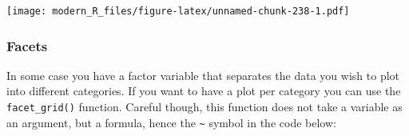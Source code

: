 \documentclass[]{gitbook}
\newenvironment{Shaded}{\begin{snugshade}}{\end{snugshade}}
\newcommand{\CommentTok}[1]{\textcolor[rgb]{0.56,0.35,0.01}{\textit{#1}}}
\newcommand{\DataTypeTok}[1]{\textcolor[rgb]{0.13,0.29,0.53}{#1}}
\newcommand{\KeywordTok}[1]{\textcolor[rgb]{0.13,0.29,0.53}{\textbf{#1}}}
\newcommand{\NormalTok}[1]{#1}
\newcommand{\OperatorTok}[1]{\textcolor[rgb]{0.81,0.36,0.00}{\textbf{#1}}}
\newcommand{\StringTok}[1]{\textcolor[rgb]{0.31,0.60,0.02}{#1}}
\theoremstyle{definition}
\theoremstyle{definition}
\theoremstyle{definition}
\theoremstyle{remark}
\begin{document}
\begin{Shaded}
\end{Shaded}

\texttt{[image: modern\_R\_files/figure-latex/unnamed-chunk-238-1.pdf]}

\hypertarget{facets}{%
\subsubsection{Facets}\label{facets}}

In some case you have a factor variable that separates the data you wish
to plot into different categories. If you want to have a plot per
category you can use the \texttt{facet\_grid()} function. Careful
though, this function does not take a variable as an argument, but a
formula, hence the \texttt{\textasciitilde{}} symbol in the code below:

\begin{Shaded}
\end{Shaded}
\end{document}
